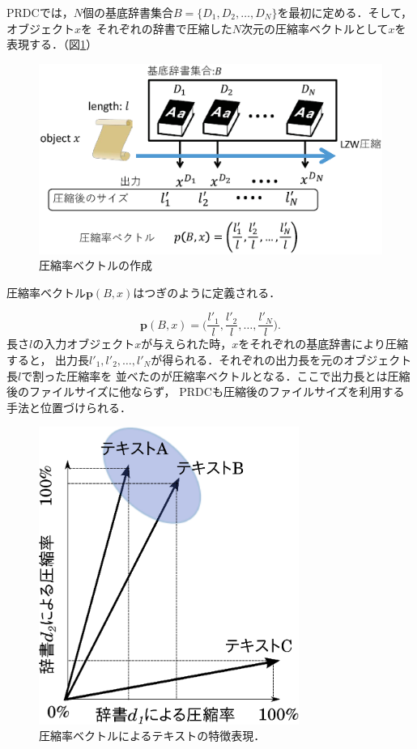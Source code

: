 PRDCでは，$N$個の基底辞書集合$B=\{D_1,D_2,\dots,D_N\}$を最初に定める．そして，オブジェクト$x$を
それぞれの辞書で圧縮した$N$次元の圧縮率ベクトルとして$x$を表現する．（図\ref{fig:PRDC.eps}）
\begin{figure}[tb]
\centering
\includegraphics[clip, width=\columnwidth]{image/PRDC.eps}
\caption{圧縮率ベクトルの作成}
\label{fig:PRDC.eps}
\end{figure}

圧縮率ベクトル$\boldsymbol{p}(B,x)$はつぎのように定義される．

\begin{equation}
\boldsymbol{p}(B,x) = \biggl(\frac{l'_1}{l}, \frac{l'_2}{l},\dots,\frac{l'_N}{l} \biggr).
\label{eq:PRDC}
\end{equation}
長さ$l$の入力オブジェクト$x$が与えられた時，$x$をそれぞれの基底辞書により圧縮すると，
出力長$l'_1,l'_2,\dots,l'_N$が得られる．それぞれの出力長を元のオブジェクト長$l$で割った圧縮率を
並べたのが圧縮率ベクトルとなる．ここで出力長とは圧縮後のファイルサイズに他ならず，
PRDCも圧縮後のファイルサイズを利用する手法と位置づけられる．

\begin{figure}[tb]
\begin{center}
\includegraphics[width=8.5cm]{image/cv.eps}
\end{center}
\caption{圧縮率ベクトルによるテキストの特徴表現．}
\label{cv}
\end{figure}

